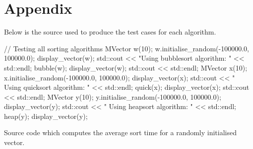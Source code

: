 \documentclass[a4paper, 12pt]{article}
\begin{document}
\section{Appendix}
Below is the source used to produce the test cases for each algorithm.
\begin{spverbatim}
	// Testing all sorting algorithms
	MVector w(10);
	w.initialise_random(-100000.0, 100000.0);
	display_vector(w);
	std::cout << "Using bubblesort algorithm: " << std::endl;
	bubble(w);
	display_vector(w);
	std::cout << std::endl;
	MVector x(10);
	x.initialise_random(-100000.0, 100000.0);
	display_vector(x);
	std::cout << " Using quicksort algorithm: " << std::endl;
	quick(x);
	display_vector(x);
	std::cout << std::endl;
	MVector y(10);
	y.initialise_random(-100000.0, 100000.0);
	display_vector(y);
	std::cout << " Using heapsort algorithm: " << std::endl;
	heap(y);
	display_vector(y);
\end{spverbatim}
Source code which computes the average sort time for a randomly initialised vector. 
\end{document}
